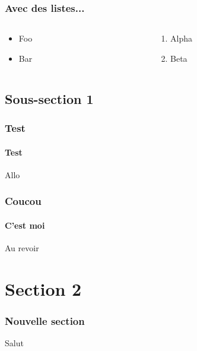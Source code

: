 \documentclass[aspectratio=169, usepdftitle=false, xcolor={dvipsnames}, 9pt]{beamer}
\begin{document}
\begin{frame}[c]
    \frametitle{Avec des listes...}
    
    \begin{columns}
        \begin{column}{0.5\textwidth}
            \begin{itemize}
                \item Foo
                \item Bar
            \end{itemize}
        \end{column}
        \begin{column}{0.5\textwidth}
           \begin{enumerate}
               \item Alpha
               \item Beta
           \end{enumerate} 
        \end{column}
    \end{columns}
\end{frame}

\subsection{Sous-section 1}

\begin{frame}[c]
    \frametitle{Test}
    \framesubtitle{Test}
    
    Allo
\end{frame}

\begin{frame}[c]
    \frametitle{Coucou}
    \framesubtitle{C'est moi}
    
    Au revoir
\end{frame}

\section{Section 2}

\begin{frame}[c]
    \frametitle{Nouvelle section}
    Salut
\end{frame}
\end{document}
